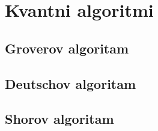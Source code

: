 \chapter{Kvantni algoritmi}
\section{Groverov algoritam}
\section{Deutschov algoritam}
\section{Shorov algoritam}